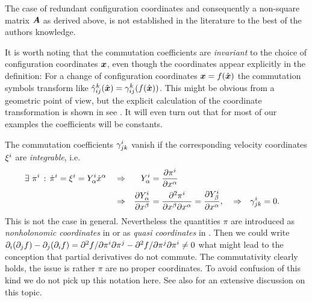 The case of redundant configuration coordinates and consequently a non-square matrix $\kinMat$ as derived above, is not established in the literature to the best of the authors knowledge.

It is worth noting that the commutation coefficients are \textit{invariant} to the choice of configuration coordinates $\sysCoord$, even though the coordinates appear explicitly in the definition:
For a change of configuration coordinates $\sysCoord = f(\sysCoordW)$ the commutation symbols transform like $\BoltzSymW{\LidxIII}{\LidxI}{\LidxII}(\sysCoordW) = \BoltzSym{\LidxIII}{\LidxI}{\LidxII}(f(\sysCoordW))$.
This might be obvious from a geometric point of view, but the explicit calculation of the coordinate transformation is shown in see .
It will even turn out that for most of our examples the coefficients will be constants.

The commutation coefficients $\BoltzSym{\LidxI}{\LidxII}{\LidxIII}$ vanish if the corresponding velocity coordinates $\sysVelCoeff{\LidxI}$ are \textit{integrable}, i.e.\
\begin{align}
 \exists \ \pi^\LidxI \, : \, \dot{\pi}^\LidxI &= \sysVelCoeff{\LidxI} = \kinBasisMatCoeff{\LidxI}{\GidxI} \sysCoordCoeffd{\GidxI}&
 &\Rightarrow&
  \kinBasisMatCoeff{\LidxI}{\GidxI} &= \pdiff[\pi^i]{\sysCoordCoeff{\GidxI}}
\nonumber\\
&&
&\Rightarrow&
 \pdiff[\kinBasisMatCoeff{\LidxI}{\GidxI}]{\sysCoordCoeff{\GidxII}}
 &= \frac{\partial^2 \pi^i}{\partial \sysCoordCoeff{\GidxII} \partial \sysCoordCoeff{\GidxI}}
 = \pdiff[\kinBasisMatCoeff{\LidxI}{\beta}]{\sysCoordCoeff{\GidxI}},&
&\Rightarrow&
 \BoltzSym{\LidxI}{\LidxII}{\LidxIII} &= 0.
\end{align}
This is not the case in general.
Nevertheless the quantities $\pi$ are introduced as \textit{nonholonomic coordinates} in \cite{Boltzmann:NonholCoord} or as \textit{quasi coordinates} in \cite[sec.\,1.5]{Lurie:AnalyticalMechanics}.
Then we could write $\partial_\LidxI (\partial_\LidxII f) - \partial_\LidxII (\partial_\LidxI f) = \sfrac{\partial^2 f}{\partial \pi^\LidxI \partial \pi^\LidxII} - \sfrac{\partial^2 f}{\partial \pi^\LidxII \partial \pi^\LidxI} \neq 0$ what might lead to the conception that partial derivatives do not commute.
The commutativity clearly holds, the issue is rather $\pi$ are no proper coordinates.
To avoid confusion of this kind we do not pick up this notation here.
See also \cite{Hamel:virtuelleVerschiebungen} for an extensive discussion on this topic.


